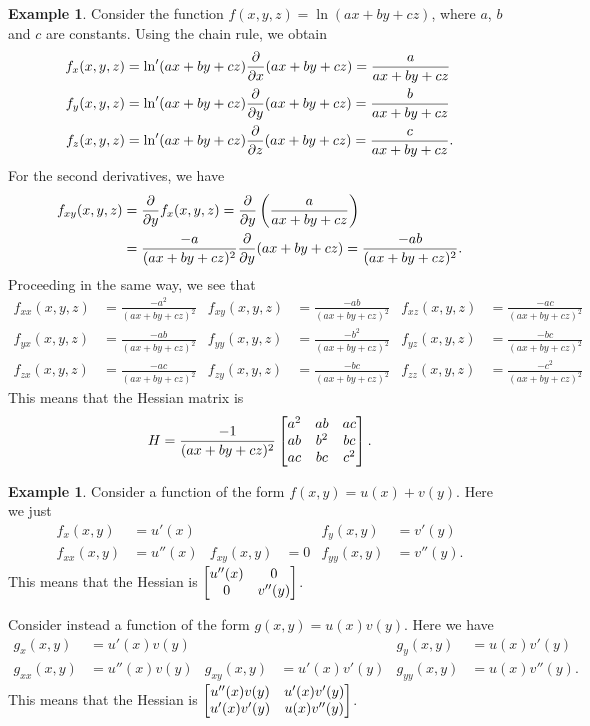 \documentclass[reqno]{amsart}
\theoremstyle{definition}
\newtheorem{example}[theorem]{Example}
\begin{document}
\begin{example}
 Consider the function $f(x,y,z)=\ln(ax+by+cz)$, where $a$, $b$ and
 $c$ are constants.  Using the chain rule, we obtain
 \begin{align*}
  f_x(x,y,z) &= \ln'(ax+by+cz)\frac{\partial}{\partial x}(ax+by+cz) 
              = \frac{a}{ax+by+cz} \\
  f_y(x,y,z) &= \ln'(ax+by+cz)\frac{\partial}{\partial y}(ax+by+cz) 
              = \frac{b}{ax+by+cz} \\
  f_z(x,y,z) &= \ln'(ax+by+cz)\frac{\partial}{\partial z}(ax+by+cz) 
              = \frac{c}{ax+by+cz}.
 \end{align*}
 For the second derivatives, we have
 \begin{align*}
  f_{xy}(x,y,z) &= \frac{\partial}{\partial y} f_x(x,y,z) 
    = \frac{\partial}{\partial y}\left(\frac{a}{ax+by+cz}\right) \\
   &= \frac{-a}{(ax+by+cz)^2} \frac{\partial}{\partial y}(ax+by+cz) 
    = \frac{-ab}{(ax+by+cz)^2}.
 \end{align*}
 Proceeding in the same way, we see that 
 \begin{align*}
  f_{xx}(x,y,z) &= \frac{-a^2}{(ax+by+cz)^2} & 
  f_{xy}(x,y,z) &= \frac{-ab }{(ax+by+cz)^2} & 
  f_{xz}(x,y,z) &= \frac{-ac }{(ax+by+cz)^2}  \\
  f_{yx}(x,y,z) &= \frac{-ab }{(ax+by+cz)^2} & 
  f_{yy}(x,y,z) &= \frac{-b^2}{(ax+by+cz)^2} & 
  f_{yz}(x,y,z) &= \frac{-bc }{(ax+by+cz)^2}  \\
  f_{zx}(x,y,z) &= \frac{-ac }{(ax+by+cz)^2} & 
  f_{zy}(x,y,z) &= \frac{-bc }{(ax+by+cz)^2} & 
  f_{zz}(x,y,z) &= \frac{-c^2}{(ax+by+cz)^2}
 \end{align*}
 This means that the Hessian matrix is 
 \[ H = \frac{-1}{(ax+by+cz)^2}
         \left[\begin{matrix} a^2 & ab & ac \\ ab & b^2 & bc \\ ac & bc & c^2 \end{matrix}\right].
 \]
\end{example}
\begin{example}
 Consider a function of the form $f(x,y)=u(x)+v(y)$.  Here we just
 \begin{align*}
  f_x(x,y) &= u'(x) &&& f_y(x,y) &= v'(y) \\
  f_{xx}(x,y) &= u''(x) & f_{xy}(x,y) &= 0 & f_{yy}(x,y) &= v''(y).
 \end{align*}
 This means that the Hessian is $\left[\begin{matrix} u''(x) & 0 \\ 0 & v''(y)\end{matrix}\right]$.

 Consider instead a function of the form $g(x,y)=u(x)v(y)$.  Here we
 have 
 \begin{align*}
  g_x(x,y) &= u'(x)v(y) &&& g_y(x,y) &= u(x)v'(y) \\
  g_{xx}(x,y) &= u''(x)v(y) &
  g_{xy}(x,y) &= u'(x)v'(y) &
  g_{yy}(x,y) &= u(x)v''(y).
 \end{align*}
 This means that the Hessian is
 $\left[\begin{matrix} u''(x)v(y) & u'(x)v'(y) \\ u'(x)v'(y) & u(x)v''(y)\end{matrix}\right]$.
\end{example}
\end{document}
